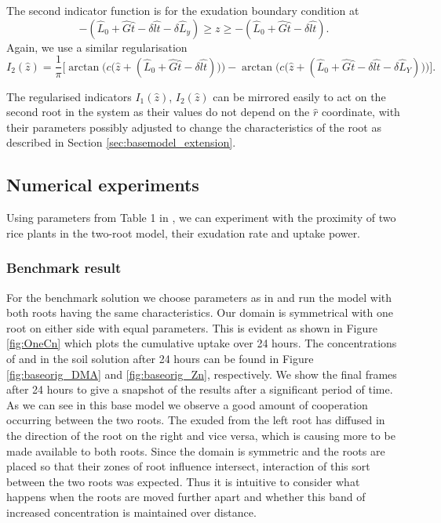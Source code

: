 \documentclass[11pt]{article}
\numberwithin{equation}{section}
\begin{document}
The second indicator function is for the exudation boundary condition at 
\[
    -(\hat L_0 + \hat G \hat t - \delta \widehat{lt} - \delta \hat L_y) \geq z \geq -(\hat L_0 + \hat G \hat t - \delta \widehat{lt}).
\]
Again, we use a similar regularisation
\begin{equation}
    I_2 (\hat z) = \frac{1}{\pi} \bigg[ \arctan\Big(c \big(\hat z + (\hat L_0 + \hat G\hat t -\delta \widehat{lt}) \big) \Big) - \arctan\big(c \big( \hat z+(\hat L_0 + \hat G \hat t - \delta \widehat{lt} - \delta \hat L_Y ) \big) \Big) \bigg].
\end{equation}

The regularised indicators $I_1(\hat z)$, $I_2(\hat z)$ can be mirrored easily to act on the second root in the system as their values do not depend on the $\hat r$ coordinate, with their parameters possibly adjusted to change the characteristics of the root as described in Section \ref{sec:basemodel_extension}.

\subsection{Numerical experiments}
\label{sec:basemodel_exper}
Using parameters from Table 1 in \cite{Ptashnyk-2011}, we can experiment with the proximity of two rice plants in the two-root model, their exudation rate and uptake power.

\subsubsection{Benchmark result}

For the benchmark solution we choose parameters as in \cite{Ptashnyk-2011} and run the model with both roots having the same characteristics. Our domain is symmetrical with one root on either side with equal parameters. This is evident as shown in Figure \ref{fig:OneCn} which plots the cumulative  uptake over 24 hours. The concentrations of  and  in the soil solution after 24 hours can be found in Figure \ref{fig:baseorig_DMA} and \ref{fig:baseorig_Zn}, respectively. We show the final frames after 24 hours to give a snapshot of the results after a significant period of time. As we can see in this base model we observe a good amount of cooperation occurring between the two roots. The  exuded from the left root has diffused in the direction of the root on the right and vice versa, which is causing more  to be made available to both roots. Since the domain is symmetric and the roots are placed so that their zones of root influence intersect, interaction of this sort between the two roots was expected. Thus it is intuitive to consider what happens when the roots are moved further apart and whether this band of increased  concentration is maintained over distance.  
\end{document}
